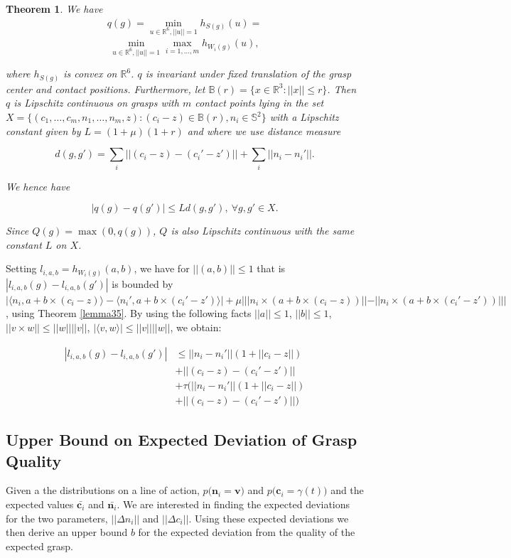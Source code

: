 \documentclass[letterpaper, 10 pt, conference]{ieeeconf}  %
\newtheorem{theorem}{Theorem}
\begin{document}
\begin{theorem}
  \cite{pokorny2013classical}
We have \\

\begin{align}
q(g) 
=
\min_{u\in \mathbb{R}^6, ||u|| =1} h_{S(g)}(u) 
=
\end{align}
\[
\min_{u\in \mathbb{R}^6, ||u|| =1} \max_{i=1,...,m} h_{W_i(g)}(u),
\]

where $h_{S(g)}$ is convex on $\mathbb{R}^6$.
$q$ is invariant under fixed translation of the grasp center and contact positions.
Furthermore, let $\mathbb{B}(r) = \lbrace x \in \mathbb{R}^3 : ||x|| \leq r \rbrace$.
Then $q$ is Lipschitz continuous on grasps with $m$ contact points lying in the set $X = \lbrace (c_1, \dots, c_m,n_1, \dots,n_m,z) : (c_i-z) \in \mathbb{B}(r), n_i \in \mathbb{S}^2 \rbrace$ with a Lipschitz constant given by $L= (1+\mu)(1+r)$ and where we use distance measure 

\[
  d(g,g') = \sum_i ||(c_i-z)-(c_i'-z')|| + \sum_i ||n_i - n_i'||.
\]

We hence have 

\[
|q(g) - q(g')| \leq Ld(g,g'),\  \forall g,g' \in X.
\]

Since $Q(g) = \max(0,q(g))$, $Q$ is also Lipschitz continuous with the same constant $L$ on $X$. 
\end{theorem}

Setting $l_{i,a,b} = h_{W_i(g)}(a,b)$, we have for $||(a,b)|| \leq 1$ that is $|l_{i,a,b}(g) - l_{i,a,b}(g')|$ is bounded by $|\langle n_i,a+b\times (c_i-z)\rangle - \langle n_i',a+b\times(c_i'-z')\rangle|+\mu|||n_i \times (a+b \times (c_i -z))|| - ||n_i \times (a + b \times (c_i' - z')) |||$, using Theorem \ref{lemma35}.
By using the following facts $||a|| \leq 1$, $||b|| \leq 1$, $||v \times w || \leq ||w||||v||$, $|\langle v,w\rangle | \leq ||v||||w||$, we obtain:  

\begin{align*}
|l_{i,a,b}(g) - l_{i,a,b}(g')| &\leq ||n_i - n_i'||(1+||c_i - z||) \\
					&+ ||(c_i - z)-(c_i'-z')|| \\
					&+ \tau(||n_i - n_i'||(1+||c_i - z||)\\
					&+||(c_i - z)-(c_i'-z')||)
\end{align*}

\subsection{Upper Bound on Expected Deviation of Grasp Quality}
Given a the distributions on a line of action, $p\big(\textbf{n}_i = \textbf{v}\big)$ and $p\big(\textbf{c}_i=\gamma(t) \big)$ and the expected values $\bar{\textbf{c}_i}$ and $\bar{\textbf{n}_i}$. We are interested in finding the expected deviations for the two parameters, $||\Delta n_i||$ and  $||\Delta c_i||$. Using these expected deviations we then derive an upper bound $b$ for the expected deviation from the quality of the expected grasp. 
\end{document}

